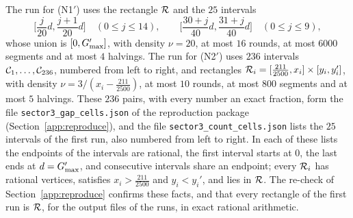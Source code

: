 The run for \textup{(N1$'$)} uses the rectangle $\mathcal{R}$ and the $25$ intervals
\[
\Big[\frac{j}{20}d,\frac{j+1}{20}d\Big]\quad(0\le j\le14),\qquad
\Big[\frac{30+j}{40}d,\frac{31+j}{40}d\Big]\quad(0\le j\le9),
\]
whose union is $[0,G_{\max}']$, with density $\nu=20$, at most $16$ rounds, at most
$6000$ segments and at most $4$ halvings. The run for \textup{(N2$'$)} uses $236$
intervals $\mathcal{C}_1,\dots,\mathcal{C}_{236}$, numbered from left to right, and rectangles
$\mathcal{R}_i=[\frac{211}{2500},x_i]\times[y_i,y_i']$, with density
$\nu=3/(x_i-\frac{211}{2500})$, at most $10$ rounds, at most $800$ segments and at
most $5$ halvings. These $236$ pairs, with every number an exact fraction, form the file
\texttt{sector3\_gap\_cells.json} of the reproduction package
(Section~\ref{app:reproduce}), and the file \texttt{sector3\_count\_cells.json}
lists the $25$ intervals of the first run, also numbered from left to right. In each of these lists the endpoints of
the intervals are rational, the first interval starts at $0$, the last ends at
$d=G_{\max}'$, and consecutive intervals share an endpoint; every $\mathcal{R}_i$ has
rational vertices, satisfies $x_i>\frac{211}{2500}$ and $y_i<y_i'$, and lies in
$\mathcal{R}$. The re-check of Section~\ref{app:reproduce} confirms these facts, and that
every rectangle of the first run is $\mathcal{R}$, for the output files of the runs, in
exact rational arithmetic.

